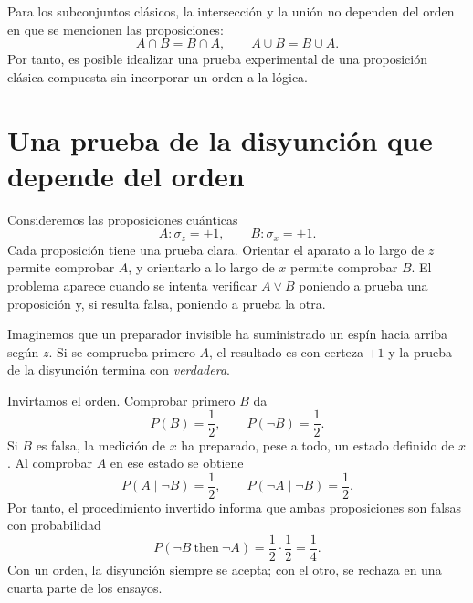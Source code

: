 \begin{classroomqa}
\end{classroomqa}

Para los subconjuntos clásicos, la intersección y la unión no dependen del orden en que se mencionen las proposiciones:
\[
A\cap B=B\cap A,\qquad A\cup B=B\cup A.
\]
Por tanto, es posible idealizar una prueba experimental de una proposición clásica compuesta sin incorporar un orden a la lógica.

\section{Una prueba de la disyunción que depende del orden}

Consideremos las proposiciones cuánticas
\begin{equation}
A:\sigma_z=+1,\qquad B:\sigma_x=+1.
\end{equation}
Cada proposición tiene una prueba clara. Orientar el aparato a lo largo de \(z\) permite comprobar \(A\), y orientarlo a lo largo de \(x\) permite comprobar \(B\). El problema aparece cuando se intenta verificar \(A\lor B\) poniendo a prueba una proposición y, si resulta falsa, poniendo a prueba la otra.

Imaginemos que un preparador invisible ha suministrado un espín hacia arriba según \(z\). Si se comprueba primero \(A\), el resultado es con certeza \(+1\) y la prueba de la disyunción termina con \emph{verdadera}.

Invirtamos el orden. Comprobar primero \(B\) da
\[
P(B)=\frac12,\qquad P(\neg B)=\frac12.
\]
Si \(B\) es falsa, la medición de \(x\) ha preparado, pese a todo, un estado definido de \(x\). Al comprobar \(A\) en ese estado se obtiene
\[
P(A\mid \neg B)=\frac12,\qquad
P(\neg A\mid \neg B)=\frac12.
\]
Por tanto, el procedimiento invertido informa que ambas proposiciones son falsas con probabilidad
\begin{equation}
P(\neg B\ \text{then}\ \neg A)
=\frac12\cdot\frac12=\frac14.
\end{equation}
Con un orden, la disyunción siempre se acepta; con el otro, se rechaza en una cuarta parte de los ensayos.

